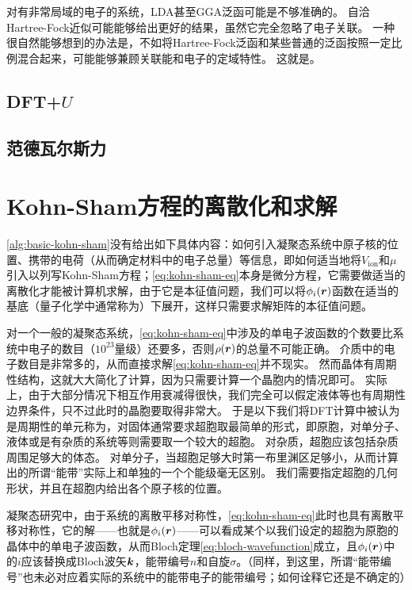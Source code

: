 对有非常局域的电子的系统，LDA甚至GGA泛函可能是不够准确的。%
自洽Hartree-Fock近似可能能够给出更好的结果，虽然它完全忽略了电子关联。
一种很自然能够想到的办法是，不如将Hartree-Fock泛函和某些普通的泛函按照一定比例混合起来，可能能够兼顾关联能和电子的定域特性。
这就是。


\subsection{DFT+$U$}

\subsection{范德瓦尔斯力}

\section{Kohn-Sham方程的离散化和求解}

\autoref{alg:basic-kohn-sham}没有给出如下具体内容：如何引入凝聚态系统中原子核的位置、携带的电荷（从而确定材料中的电子总量）等信息，即如何适当地将$V_\text{ion}$和$\mu$引入以列写Kohn-Sham方程；\eqref{eq:kohn-sham-eq}本身是微分方程，它需要做适当的离散化才能被计算机求解，由于它是本征值问题，我们可以将$\phi_i(\vb*{r})$函数在适当的基底（量子化学中通常称为）下展开，这样只需要求解矩阵的本征值问题。

对一个一般的凝聚态系统，\eqref{eq:kohn-sham-eq}中涉及的单电子波函数的个数要比系统中电子的数目（$10^{23}$量级）还要多，否则$\rho(\vb*{r})$的总量不可能正确。
介质中的电子数目是非常多的，从而直接求解\eqref{eq:kohn-sham-eq}并不现实。
然而晶体有周期性结构，这就大大简化了计算，因为只需要计算一个晶胞内的情况即可。
实际上，由于大部分情况下相互作用衰减得很快，我们完全可以假定液体等也有周期性边界条件，只不过此时的晶胞要取得非常大。
于是以下我们将DFT计算中被认为是周期性的单元称为，对固体通常要求超胞取最简单的形式，即原胞，对单分子、液体或是有杂质的系统等则需要取一个较大的超胞。
对杂质，超胞应该包括杂质周围足够大的体态。
对单分子，当超胞足够大时第一布里渊区足够小，从而计算出的所谓“能带”实际上和单独的一个个能级毫无区别。
我们需要指定超胞的几何形状，并且在超胞内给出各个原子核的位置。

凝聚态研究中，由于系统的离散平移对称性，\eqref{eq:kohn-sham-eq}此时也具有离散平移对称性，它的解——也就是$\phi_i(\vb*{r})$——可以看成某个以我们设定的超胞为原胞的晶体中的单电子波函数，从而Bloch定理\eqref{eq:bloch-wavefunction}成立，且$\phi_i(\vb*{r})$中的$i$应该替换成Bloch波矢$\vb*{k}$，能带编号$n$和自旋$\sigma$。（同样，到这里，所谓“能带编号”也未必对应着实际的系统中的能带电子的能带编号；如何诠释它还是不确定的）

